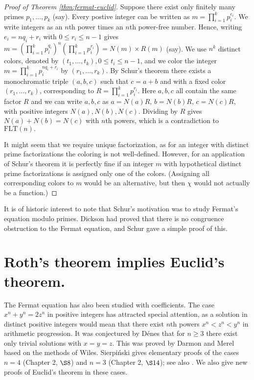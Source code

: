 \documentclass{article}
\theoremstyle{theorem}
\theoremstyle{definition}
\newcommand{\FLT}{\mathrm{FLT}}
\begin{document}
\begin{proof}[Proof of Theorem \ref{thm:fermat-euclid}]
Suppose there exist only finitely many primes $p_1, \ldots, p_k$ (say).
Every postive integer
can be written as $m= \prod_{i=1}^k p_i^{e_i}$. We write
integers as an $n$th power times an $n$th power-free number.
Hence, writing $e_i=nq_i +r_i$ with \mbox{$0 \leq r_i \leq n-1$} gives
$m= \left(\prod_{i=1}^k p_i^{q_i}\right)^n \left( \prod_{i=1}^k
  p_i^{r_i}\right) =N(m)\times R(m)$ (say).
We use $n^k$ distinct colors, denoted by $(t_1, \ldots, t_k), 0 \leq t_i \leq
n-1$, and we
color the integer $m= \prod_{i=1}^k p_i^{n q_i +r_i}$ by $(r_1, \ldots ,r_k)$. 
By Schur's theorem there exists a monochromatic
triple $(a,b,c)$ such that $c=a+b$ and with a fixed color
$(r_1, \ldots , r_k)$, corresponding to
$R=\prod_{i=1}^k p_i^{r_i}$.
Here $a,b,c$ all contain the same factor $R$ and
we can write $a,b,c$ as $a=N(a)R,\, b=N(b)R,\, c=N(c)R$, 
with positive integers $N(a), N(b), N(c)$.
 Dividing by $R$
gives $N(a)+N(b)=N(c)$ with $n$th powers, which is a contradiction to 
$\FLT(n).$

It might seem that we require unique factorization, as for an integer
with distinct prime factorizations the coloring is not well-defined.
However, for an application of Schur's theorem
it is perfectly fine if an integer $m$ with hypothetical distinct 
prime factorizations is assigned only one of the colors.
(Assigning all corresponding colors to $m$ would be an alternative, but then
$\chi$ would not actually be a function.)
\end{proof}

It is of historic interest to note that Schur's motivation was to study
Fermat's equation modulo primes. Dickson had proved 
that there is no congruence obstruction to the Fermat equation, 
and Schur \cite{Schur} gave a simple proof of this.


\section{Roth's theorem implies Euclid's theorem.}
{\label{sec:Roth}}
The Fermat equation has also been studied with coefficients.
The case $x^n+y^n=2z^n$ in positive integers
has attracted special attention, as a solution in distinct positive integers
would mean that there exist $n$th powers $x^n< z^n< y^n$ 
in arithmetic progression.
It was conjectured by D\'{e}nes that for $n\geq 3$ there exist only
trivial solutions with $x=y=z$. This was proved by 
Darmon and Merel \cite{DarmonandMerel} based on
the methods of Wiles. 
Sierpi\'nski \cite{Sierpinski}
gives elementary proofs of the cases $n=4$ (Chapter 2, $\S 8$)
and $n=3$ (Chapter 2, $\S 14$); see also \cite{Carmichael}.
We also give new proofs of Euclid's theorem in these cases.
\end{document}
